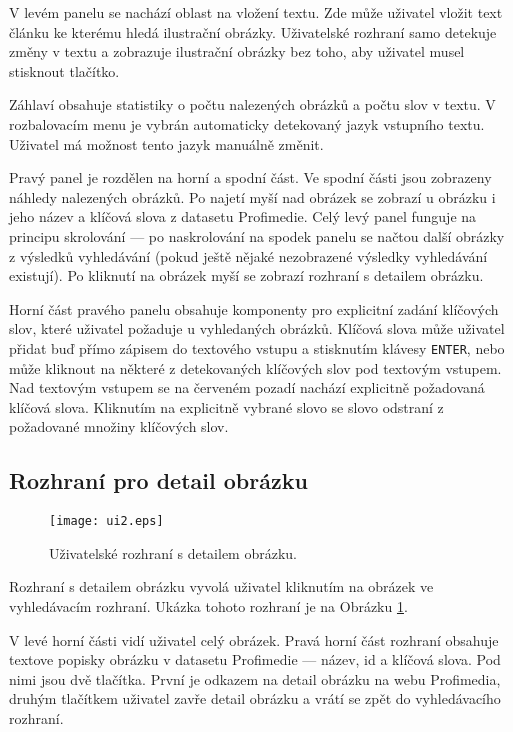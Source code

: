 V levém panelu se nachází oblast na vložení textu. Zde může uživatel vložit text článku ke kterému hledá ilustrační obrázky. Uživatelské rozhraní samo detekuje změny v textu a zobrazuje ilustrační obrázky bez toho, aby uživatel musel stisknout tlačítko.

Záhlaví obsahuje statistiky o počtu nalezených obrázků a počtu slov v textu. V rozbalovacím menu je vybrán automaticky detekovaný jazyk vstupního textu. Uživatel má možnost tento jazyk manuálně změnit.

Pravý panel je rozdělen na horní a spodní část. Ve spodní části jsou zobrazeny náhledy nalezených obrázků. Po najetí myší nad obrázek se zobrazí u obrázku i jeho název a klíčová slova z datasetu Profimedie. Celý levý panel funguje na principu  skrolování --- po naskrolování na spodek panelu se načtou další obrázky z výsledků vyhledávání (pokud ještě nějaké nezobrazené výsledky vyhledávání existují). Po kliknutí na obrázek myší se zobrazí rozhraní s detailem obrázku.

Horní část pravého panelu obsahuje komponenty pro explicitní zadání klíčových slov, které uživatel požaduje u vyhledaných obrázků. Klíčová slova může uživatel přidat buď přímo zápisem do textového vstupu  a stisknutím klávesy \lstinline{ENTER}, nebo může kliknout na některé z detekovaných klíčových slov pod textovým vstupem. Nad textovým vstupem se na červeném pozadí nachází explicitně požadovaná klíčová slova. Kliknutím na explicitně vybrané slovo se slovo odstraní z požadované množiny klíčových slov.

\subsection{Rozhraní pro detail obrázku}

\begin{figure}[h]
  \centering
  \texttt{[image: ui2.eps]}
  \caption{Uživatelské rozhraní s detailem obrázku.}
  \label{fig:ui2}
\end{figure}

Rozhraní s detailem obrázku vyvolá uživatel kliknutím na obrázek ve vyhledávacím rozhraní. Ukázka tohoto rozhraní je na Obrázku \ref{fig:ui2}.

V levé horní části vidí uživatel celý obrázek. Pravá horní část rozhraní obsahuje textove popisky obrázku v datasetu Profimedie --- název, id a klíčová slova. Pod nimi jsou dvě tlačítka. První je odkazem na detail obrázku na webu Profimedia, druhým tlačítkem uživatel zavře detail obrázku a vrátí se zpět do vyhledávacího rozhraní.

